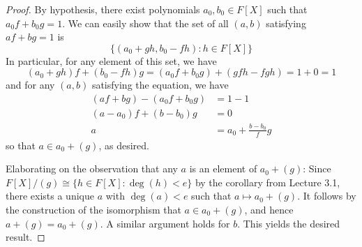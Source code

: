 \documentclass[../psets.tex]{subfiles}
\begin{document}
\begin{enumerate}
\begin{proof}


        By hypothesis, there exist polynomials $a_0,b_0\in F[X]$ such that $a_0f+b_0g=1$. We can easily show that the set of all $(a,b)$ satisfying $af+bg=1$ is
        \begin{equation*}
            \{(a_0+gh,b_0-fh):h\in F[X]\}
        \end{equation*}
        In particular, for any element of this set, we have
        \begin{equation*}
            (a_0+gh)f+(b_0-fh)g = (a_0f+b_0g)+(gfh-fgh)
            = 1+0
            = 1
        \end{equation*}
        and for any $(a,b)$ satisfying the equation, we have
        \begin{align*}
            (af+bg)-(a_0f+b_0g) &= 1-1\\
            (a-a_0)f+(b-b_0)g &= 0\\
            a &= a_0+\frac{b-b_0}{f}g
        \end{align*}
        so that $a\in a_0+(g)$, as desired.\par
        Elaborating on the observation that any $a$ is an element of $a_0+(g)$: Since $F[X]/(g)\cong\{h\in F[X]:\deg(h)<e\}$ by the corollary from Lecture 3.1, there exists a unique $a$ with $\deg(a)<e$ such that $a\mapsto a_0+(g)$. It follows by the construction of the isomorphism that $a\in a_0+(g)$, and hence $a+(g)=a_0+(g)$. A similar argument holds for $b$. This yields the desired result.
    \end{proof}
\end{enumerate}
\end{document}
